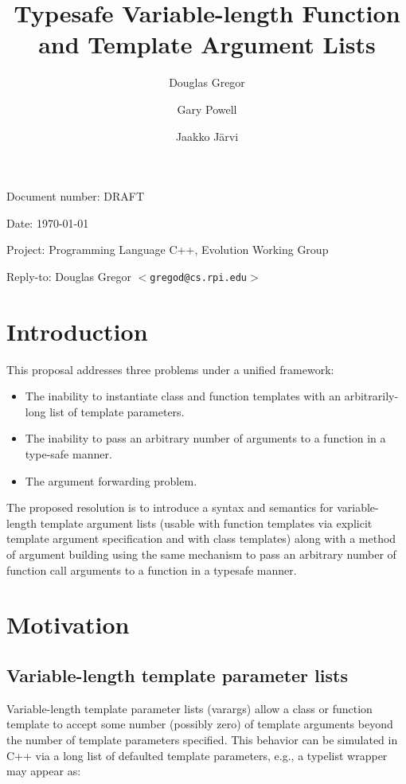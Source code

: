 \documentclass{article}
\begin{document}
\pagestyle{myheadings}

\title{Typesafe Variable-length Function and Template Argument Lists}
\author{Douglas Gregor \and Gary Powell \and Jaakko J\"arvi}
\date{}
\maketitle

\par\noindent Document number: DRAFT
\par\noindent Date: \today
\par\noindent Project: Programming Language C++, Evolution Working Group
\par\noindent Reply-to: Douglas Gregor $<${\tt gregod@cs.rpi.edu}$>$

\section{Introduction}
This proposal addresses three problems under a unified framework:
\begin{itemize}
\item The inability to instantiate class and function templates with an arbitrarily-long list of template parameters.
\item The inability to pass an arbitrary number of arguments to a function in a type-safe manner.
\item The argument forwarding problem.
\end{itemize}

The proposed resolution is to introduce a syntax and semantics for
variable-length template argument lists (usable with function templates
via explicit template argument specification and with class templates)
along with a method of argument building using the same mechanism to
pass an arbitrary number of function call arguments to a function in a
typesafe manner.

\section{Motivation}
\subsection{Variable-length template parameter lists}
Variable-length template parameter lists (varargs) allow a class or
function template to accept some number (possibly zero) of template
arguments beyond the number of template parameters specified. This
behavior can be simulated in C++ via a long list of defaulted template
parameters, e.g., a typelist wrapper may appear as:
\end{document}
